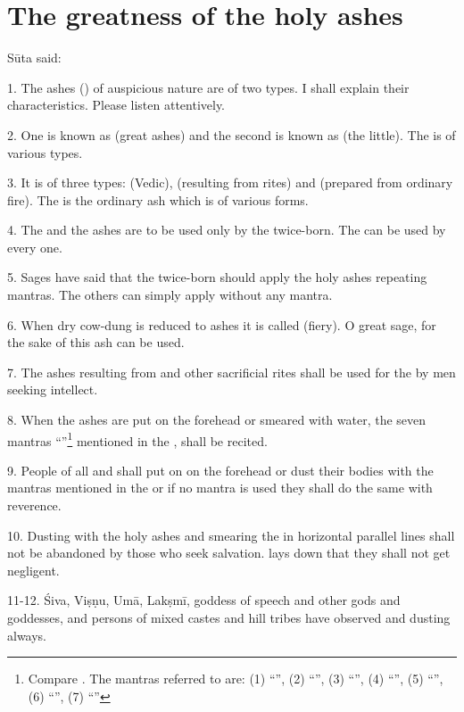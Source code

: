 \chapter{The greatness of the holy ashes}

Sūta said:

1. The ashes () of auspicious nature are of two types. I shall
explain their characteristics. Please listen attentively.

2. One is known as  (great ashes) and the second is known as
 (the little). The  is of various types.

3. It is of three types:  (Vedic),  (resulting from
 rites) and  (prepared from ordinary fire).
The  is the ordinary ash which is of various forms.

4. The  and the  ashes are to be used only by
the twice-born. The  can be used by every one.

5. Sages have said that the twice-born should apply the holy ashes repeating
mantras. The others can simply apply without any mantra.

6. When dry cow-dung is reduced to ashes it is called  (fiery).
O great sage, for the sake of  this ash can be used.

7. The ashes resulting from  and other sacrificial rites shall be
used for the  by men seeking intellect.

8. When the ashes are put on the forehead or smeared with water, the seven
mantras “”\footnote{Compare . The mantras
referred to are: (1) “”, (2) “”,
(3) “”, (4) “”,
(5) “”, (6) “”, (7) “”} \etc
mentioned in the , shall be recited.

9. People of all  and  shall put on  on
the forehead or dust their bodies with the mantras mentioned in the  or if no mantra is used they shall do the same with reverence.

10. Dusting with the holy ashes and smearing the  in horizontal
parallel lines shall not be abandoned by those who seek salvation. 
lays down that they shall not get negligent.

11-12. Śiva, Viṣṇu, Umā, Lakṣmī, goddess of speech and other gods and goddesses,
 and persons of mixed castes and hill tribes
have observed  and dusting always.

